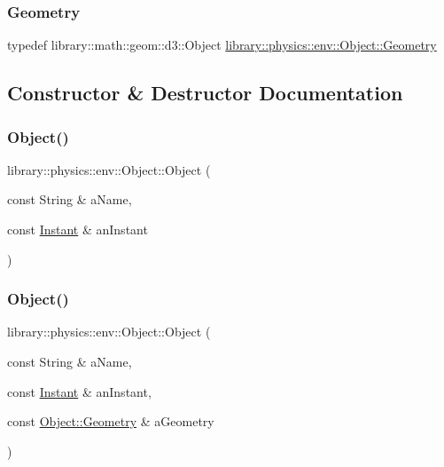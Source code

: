 \subsubsection{\texorpdfstring{Geometry}{Geometry}}
{\footnotesize\ttfamily typedef library\+::math\+::geom\+::d3\+::\+Object \hyperlink{classlibrary_1_1physics_1_1env_1_1_object_a750fd821b17667fec9e0a4eda23af048}{library\+::physics\+::env\+::\+Object\+::\+Geometry}}



\subsection{Constructor \& Destructor Documentation}
\mbox{\label{classlibrary_1_1physics_1_1env_1_1_object_af112257aa51a94dcc61a36e2c0db4b05}} 
\subsubsection{\texorpdfstring{Object()}{Object()}\hspace{0.1cm}{\footnotesize\ttfamily [1/3]}}
{\footnotesize\ttfamily library\+::physics\+::env\+::\+Object\+::\+Object (\begin{DoxyParamCaption}\item[{const String \&}]{a\+Name,  }\item[{const \hyperlink{classlibrary_1_1physics_1_1time_1_1_instant}{Instant} \&}]{an\+Instant }\end{DoxyParamCaption})}

\mbox{\label{classlibrary_1_1physics_1_1env_1_1_object_a37e5ddc8f0b89e006025a7ac6ac71fe5}} 
\subsubsection{\texorpdfstring{Object()}{Object()}\hspace{0.1cm}{\footnotesize\ttfamily [2/3]}}
{\footnotesize\ttfamily library\+::physics\+::env\+::\+Object\+::\+Object (\begin{DoxyParamCaption}\item[{const String \&}]{a\+Name,  }\item[{const \hyperlink{classlibrary_1_1physics_1_1time_1_1_instant}{Instant} \&}]{an\+Instant,  }\item[{const \hyperlink{classlibrary_1_1physics_1_1env_1_1_object_a750fd821b17667fec9e0a4eda23af048}{Object\+::\+Geometry} \&}]{a\+Geometry }\end{DoxyParamCaption})}

